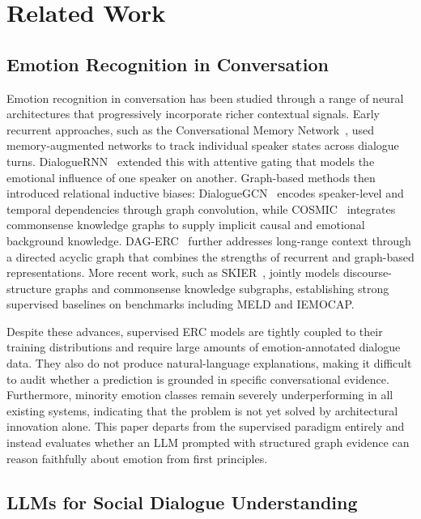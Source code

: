 \documentclass[runningheads]{llncs}
\begin{document}
\section{Related Work}
\label{sec:related}

\subsection{Emotion Recognition in Conversation}

Emotion recognition in conversation has been studied through a range of
neural architectures that progressively incorporate richer contextual
signals. Early recurrent approaches, such as the Conversational Memory
Network~\cite{hazarika2018conversational}, used memory-augmented networks
to track individual speaker states across dialogue turns.
DialogueRNN~\cite{majumder2019dialoguernn} extended this with attentive
gating that models the emotional influence of one speaker on another.
Graph-based methods then introduced relational inductive biases:
DialogueGCN~\cite{ghosal2019dialoguegcn} encodes speaker-level and
temporal dependencies through graph convolution, while
COSMIC~\cite{ghosal2020cosmic} integrates commonsense knowledge graphs
to supply implicit causal and emotional background knowledge.
DAG-ERC~\cite{shen2021dag} further addresses long-range context through
a directed acyclic graph that combines the strengths of recurrent and
graph-based representations. More recent work, such as
SKIER~\cite{li2023skier}, jointly models discourse-structure graphs and
commonsense knowledge subgraphs, establishing strong supervised baselines
on benchmarks including MELD and IEMOCAP.

Despite these advances, supervised ERC models are tightly coupled to
their training distributions and require large amounts of emotion-annotated
dialogue data. They also do not produce natural-language explanations,
making it difficult to audit whether a prediction is grounded in specific
conversational evidence. Furthermore, minority emotion classes remain
severely underperforming in all existing systems, indicating that the
problem is not yet solved by architectural innovation alone. This paper
departs from the supervised paradigm entirely and instead evaluates
whether an LLM prompted with structured graph evidence can reason
faithfully about emotion from first principles.

\subsection{LLMs for Social Dialogue Understanding}
\end{document}
